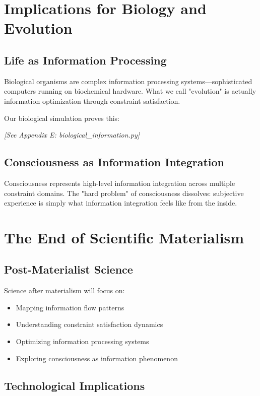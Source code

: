 \documentclass[12pt]{article}
\begin{document}
\section{Implications for Biology and Evolution}

\subsection{Life as Information Processing}

Biological organisms are complex information processing systems—sophisticated computers running on biochemical hardware. What we call "evolution" is actually information optimization through constraint satisfaction.

Our biological simulation proves this:

\textit{[See Appendix E: biological\_information.py]}

\subsection{Consciousness as Information Integration}

Consciousness represents high-level information integration across multiple constraint domains. The "hard problem" of consciousness dissolves: subjective experience is simply what information integration feels like from the inside.

\section{The End of Scientific Materialism}

\subsection{Post-Materialist Science}

Science after materialism will focus on:

\begin{itemize}
\item Mapping information flow patterns
\item Understanding constraint satisfaction dynamics
\item Optimizing information processing systems
\item Exploring consciousness as information phenomenon
\end{itemize}

\subsection{Technological Implications}
\end{document}
